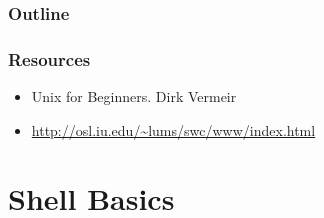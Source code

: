 



\begin{frame}\frametitle{Outline}
\end{frame}

\begin{frame}\frametitle{Resources}
\begin{itemize}
\item Unix for Beginners. Dirk Vermeir
\item \url{http://osl.iu.edu/~lums/swc/www/index.html}
\end{itemize}
\end{frame}





\section{Shell Basics}

